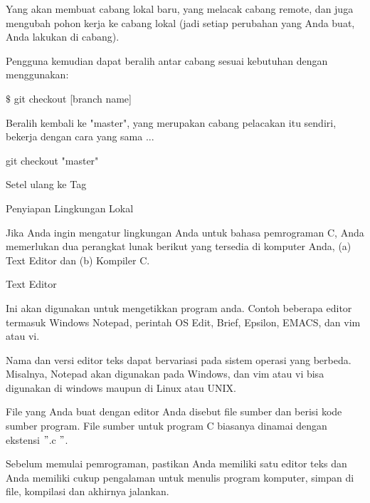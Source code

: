 \vspace{12pt}
\noindent 
Yang akan membuat cabang lokal baru, yang melacak cabang remote, dan juga mengubah pohon kerja ke cabang lokal (jadi setiap perubahan yang Anda buat, Anda lakukan di cabang). \par
\noindent 
Pengguna kemudian dapat beralih antar cabang sesuai kebutuhan dengan menggunakan: \par
\vspace{12pt}
\noindent 
  $  \$  $ git checkout [branch name]  \par
\vspace{12pt}
\noindent 
 $  $Beralih kembali ke "master", yang merupakan cabang pelacakan itu sendiri, bekerja dengan cara yang sama ... \par
\vspace{12pt}
\noindent 
 git checkout "master"  \par
\vspace{12pt}
\noindent 
 $  $Setel ulang ke Tag \par
\vspace{12pt}
\vspace{12pt}
\noindent 
Penyiapan Lingkungan Lokal \par
\vspace{12pt}
\noindent 
Jika Anda ingin mengatur lingkungan Anda untuk bahasa pemrograman C, Anda memerlukan dua perangkat lunak berikut yang tersedia di komputer Anda, (a) Text Editor dan (b) Kompiler C. \par
\vspace{12pt}
\noindent 
Text Editor \par
\vspace{12pt}
\noindent 
Ini akan digunakan untuk mengetikkan program anda. Contoh beberapa editor termasuk Windows Notepad, perintah OS Edit, Brief, Epsilon, EMACS, dan vim atau vi. \par
\vspace{12pt}
\noindent 
Nama dan versi editor teks dapat bervariasi pada sistem operasi yang berbeda. Misalnya, Notepad akan digunakan pada Windows, dan vim atau vi bisa digunakan di windows maupun di Linux atau UNIX. \par
\vspace{12pt}
\noindent 
File yang Anda buat dengan editor Anda disebut file sumber dan berisi kode sumber program. File sumber untuk program C biasanya dinamai dengan ekstensi  $ " $.c $ " $. \par
\vspace{12pt}
\noindent 
Sebelum memulai pemrograman, pastikan Anda memiliki satu editor teks dan Anda memiliki cukup pengalaman untuk menulis program komputer, simpan di file, kompilasi dan akhirnya jalankan. \par
